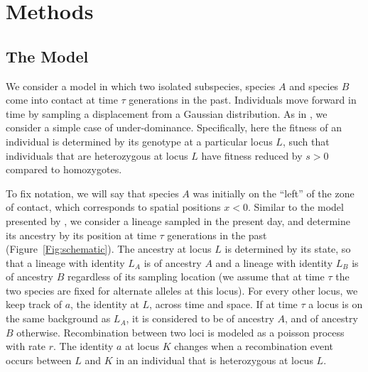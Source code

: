 \documentclass[12pt]{article}
\begin{document}



	
\section{Methods}
\subsection*{The Model}
We consider a model in which two isolated subspecies, species $A$ and species $B$ come into contact at time $\tau$ generations in the past. Individuals move forward in time by sampling a displacement from a Gaussian distribution. As in \cite{Barton??}, we consider a simple case of under-dominance. Specifically, here the fitness of an individual is  determined by its genotype at a particular locus $L$, such that individuals that are heterozygous at locus $L$ have fitness reduced by $s>0$ compared to homozygotes.

To fix notation, we will say that species $A$ was initially on the ``left'' of the zone of contact,
which corresponds to spatial positions $x<0$. Similar to the model presented by \cite{Sedghifar2015}, we consider a lineage sampled in the present day, and determine its ancestry by its position at time $\tau$ generations in the past (Figure~\ref{Fig:schematic}). The ancestry at locus $L$ is determined by its state, so that a lineage with identity $L_A$ is of ancestry $A$ and a lineage with identity $L_B$ is of ancestry $B$ regardless of its sampling location (we assume that at time $\tau$ the two species are fixed for alternate alleles at this locus). For every other locus, we keep track of $a$, the identity at $L$, across time and space. If at time $\tau$ a locus is on the same background as $L_A$, it is considered to be of ancestry $A$, and of ancestry $B$ otherwise. Recombination between two loci is modeled as a poisson process with rate $r$. The identity $a$ at locus $K$ changes when a recombination event occurs between $L$ and $K$ in an individual that is heterozygous at locus $L$. 
\end{document}
